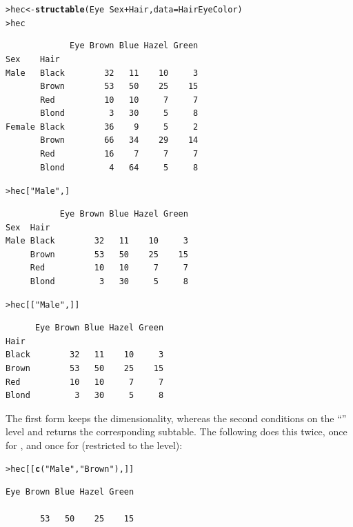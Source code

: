 \documentclass[10pt,krantz2]{krantz}\usepackage[]{graphicx}\usepackage[]{color}
\makeatletter
\newcommand{\hlstr}[1]{\textcolor[rgb]{0.192,0.494,0.8}{#1}}%
\newcommand{\hlopt}[1]{\textcolor[rgb]{0,0,0}{#1}}%
\newcommand{\hlstd}[1]{\textcolor[rgb]{0.345,0.345,0.345}{#1}}%
\newcommand{\hlkwb}[1]{\textcolor[rgb]{0.69,0.353,0.396}{#1}}%
\newcommand{\hlkwc}[1]{\textcolor[rgb]{0.333,0.667,0.333}{#1}}%
\newcommand{\hlkwd}[1]{\textcolor[rgb]{0.737,0.353,0.396}{\textbf{#1}}}%
\newenvironment{kframe}{%
 \def\at@end@of@kframe{}%
 \ifinner\ifhmode%
  \def\at@end@of@kframe{\end{minipage}}%
  \begin{minipage}{\columnwidth}%
 \fi\fi%
 \def\FrameCommand##1{\hskip\@totalleftmargin \hskip-\fboxsep
 \colorbox{shadecolor}{##1}\hskip-\fboxsep
     \hskip-\linewidth \hskip-\@totalleftmargin \hskip\columnwidth}%
 \MakeFramed {\advance\hsize-\width
   \@totalleftmargin\z@ \linewidth\hsize
   \@setminipage}}%
 {\par\unskip\endMakeFramed%
 \at@end@of@kframe}
\newenvironment{knitrout}{}{} %
\renewenvironment{knitrout}{\small\renewcommand{\baselinestretch}{.85}}{} %
\makeatother
\begin{document}
\begin{knitrout}
\color{fgcolor}\begin{kframe}
\begin{alltt}
\hlstd{> }\hlstd{hec} \hlkwb{<-} \hlkwd{structable}\hlstd{(Eye} \hlopt{~} \hlstd{Sex} \hlopt{+} \hlstd{Hair,} \hlkwc{data} \hlstd{= HairEyeColor)}
\hlstd{> }\hlstd{hec}
\end{alltt}
\begin{verbatim}
             Eye Brown Blue Hazel Green
Sex    Hair                            
Male   Black        32   11    10     3
       Brown        53   50    25    15
       Red          10   10     7     7
       Blond         3   30     5     8
Female Black        36    9     5     2
       Brown        66   34    29    14
       Red          16    7     7     7
       Blond         4   64     5     8
\end{verbatim}
\begin{alltt}
\hlstd{> }\hlstd{hec[}\hlstr{"Male"}\hlstd{,]}
\end{alltt}
\begin{verbatim}
           Eye Brown Blue Hazel Green
Sex  Hair                            
Male Black        32   11    10     3
     Brown        53   50    25    15
     Red          10   10     7     7
     Blond         3   30     5     8
\end{verbatim}
\begin{alltt}
\hlstd{> }\hlstd{hec[[}\hlstr{"Male"}\hlstd{,]]}
\end{alltt}
\begin{verbatim}
      Eye Brown Blue Hazel Green
Hair                            
Black        32   11    10     3
Brown        53   50    25    15
Red          10   10     7     7
Blond         3   30     5     8
\end{verbatim}
\end{kframe}
\end{knitrout}

\noindent The first form keeps the dimensionality, whereas the second
conditions on the ``'' level and returns the corresponding
subtable. The following does this twice, once for , and once
for  (restricted to the  level):

\begin{knitrout}
\color{fgcolor}\begin{kframe}
\begin{alltt}
\hlstd{> }\hlstd{hec[[}\hlkwd{c}\hlstd{(}\hlstr{"Male"}\hlstd{,} \hlstr{"Brown"}\hlstd{),]]}
\end{alltt}
\begin{verbatim}
Eye Brown Blue Hazel Green
                          
       53   50    25    15
\end{verbatim}
\end{kframe}
\end{knitrout}
\end{document}
